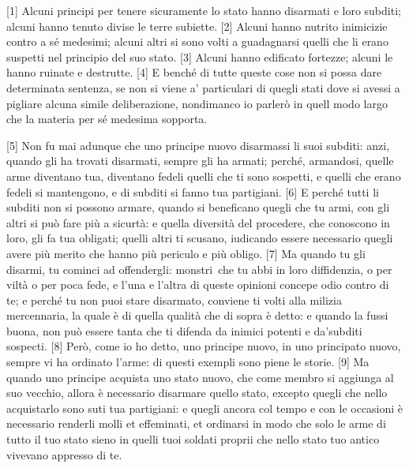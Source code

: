 
{[}1{]} Alcuni principi per tenere sicuramente lo stato hanno disarmati
e loro subditi; alcuni hanno tenuto divise le terre subiette. {[}2{]}
Alcuni hanno nutrito inimicizie contro a sé medesimi; alcuni altri si
sono volti a guadagnarsi quelli che li erano suspetti nel principio del
suo stato. {[}3{]} Alcuni hanno edificato fortezze; alcuni le hanno
ruinate e destrutte. {[}4{]} E benché di tutte queste cose non si possa
dare determinata sentenza, se non si viene a' particulari di quegli
stati dove si avessi a pigliare alcuna simile deliberazione, nondimanco
io parlerò in quell modo largo che la materia per sé medesima sopporta.

{[}5{]} Non fu mai adunque che uno principe nuovo disarmassi li suoi
subditi: anzi, quando gli ha trovati disarmati, sempre gli ha armati;
perché, armandosi, quelle arme diventano tua, diventano fedeli quelli
che ti sono sospetti, e quelli che erano fedeli si mantengono, e di
subditi si fanno tua partigiani. {[}6{]} E perché tutti li subditi non
si possono armare, quando si beneficano quegli che tu armi, con gli
altri si può fare più a sicurtà: e quella diversità del procedere, che
conoscono in loro, gli fa tua obligati; quelli altri ti scusano,
iudicando essere necessario quegli avere più merito che hanno più
periculo e più obligo. {[}7{]} Ma quando tu gli disarmi, tu cominci ad
offendergli: monstri\est\ che tu abbi in loro diffidenzia, o per viltà o per
poca fede, e l'una e l'altra di queste opinioni concepe odio contro di
te; e perché tu non puoi stare disarmato, conviene ti volti alla milizia
mercennaria, la quale è di quella qualità che di sopra è detto: e quando
la fussi buona, non può essere tanta che ti difenda da inimici potenti e
da'subditi sospecti. {[}8{]} Però, come io ho detto, uno principe nuovo,
in uno principato nuovo, sempre vi ha ordinato l'arme: di questi exempli
sono piene le storie. {[}9{]} Ma quando uno principe acquista uno stato
nuovo, che come membro si aggiunga al suo vecchio, allora è necessario
disarmare quello stato, excepto quegli che nello acquistarlo sono suti
tua partigiani: e quegli ancora col tempo e con le occasioni è
necessario renderli molli et effeminati, et ordinarsi in modo che solo
le arme di tutto il tuo stato sieno in quelli tuoi soldati proprii che
nello stato tuo antico vivevano appresso di te.

